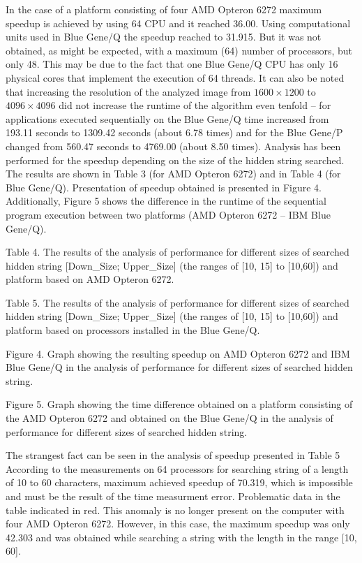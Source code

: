 \documentclass[10pt, a5paper]{article}
\begin{document}
In the case of a platform consisting of four AMD Opteron 6272 maximum speedup is achieved by using 64 CPU and it reached 36.00. Using computational units used in Blue Gene/Q the speedup reached to 31.915. But it was not obtained, as might be expected, with a maximum (64) number of processors, but only 48. This may be due to the fact that one Blue Gene/Q CPU has only 16 physical cores that implement the execution of 64 threads.
It can also be noted that increasing the resolution of the analyzed image from $1600\times1200$ to $4096\times4096$ did not increase the runtime of the algorithm even tenfold -- for applications executed sequentially on the Blue Gene/Q time increased from 193.11 seconds to 1309.42 seconds (about 6.78 times) and for the Blue Gene/P changed from 560.47 seconds to 4769.00 (about 8.50 times). Analysis has been performed for the speedup depending on the size of the hidden string searched. The results are shown in Table 3 (for AMD Opteron 6272) and in Table 4 (for Blue Gene/Q). Presentation of speedup obtained is presented in Figure 4. Additionally, Figure 5 shows the difference in the runtime of the sequential program execution between two platforms (AMD Opteron 6272 -- IBM Blue Gene/Q).


Table 4. The results of the analysis of performance for different sizes of searched hidden string [Down\_Size; Upper\_Size] (the ranges of [10, 15] to [10,60]) and platform based on AMD Opteron 6272.


Table 5. The results of the analysis of performance for different sizes of searched hidden string [Down\_Size; Upper\_Size] (the ranges of [10, 15] to [10,60]) and platform based on processors installed in the Blue Gene/Q.


Figure 4. Graph showing the resulting speedup on AMD Opteron 6272 and IBM Blue Gene/Q in the analysis of performance for different sizes of searched hidden string.


Figure 5. Graph showing the time difference obtained on a platform consisting of the AMD Opteron 6272 and obtained on the Blue Gene/Q in the analysis of performance for different sizes of searched hidden string.

The strangest fact can be seen in the analysis of speedup presented in Table 5 According to the measurements on 64 processors for searching string of a length of 10 to 60 characters, maximum achieved speedup of 70.319, which is impossible and must be the result of the time measurment error. Problematic data in the table indicated in red. This anomaly is no longer present on the computer with four AMD Opteron 6272. However, in this case, the maximum speedup was only 42.303 and was obtained while searching a string with the length in the range [10, 60].
\end{document}
